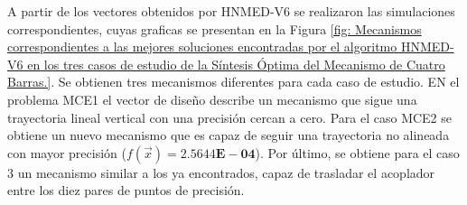 A partir de los vectores obtenidos por HNMED-V6 se realizaron las simulaciones correspondientes, cuyas graficas se presentan en la Figura \ref{fig: Mecanismos correspondientes a las mejores soluciones encontradas por el algoritmo HNMED-V6 en los
	tres casos de estudio de la Síntesis Óptima del Mecanismo de Cuatro Barras.}. Se obtienen tres mecanismos diferentes para cada caso de estudio. EN el problema MCE1 el vector de diseño describe un mecanismo que sigue una trayectoria lineal vertical con una precisión cercan a cero.  Para el caso MCE2 se obtiene un nuevo mecanismo que es capaz de seguir una trayectoria no alineada con mayor precisión ($f(\vec{x})=\boldsymbol{2.5644E-04}$). Por último,  se obtiene para el caso 3 un mecanismo similar a los ya encontrados, capaz de trasladar el acoplador entre los diez pares de puntos de precisión.

